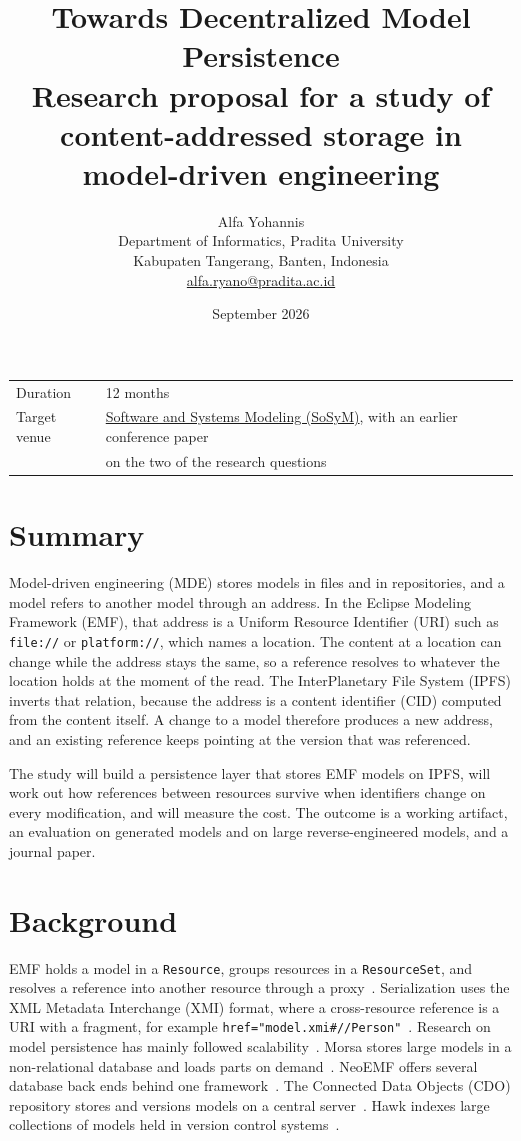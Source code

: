 \documentclass[11pt,a4paper]{article}
\title{\vspace{-12mm}\textbf{Towards Decentralized Model Persistence}\\[2mm]
\large Research proposal for a study of content-addressed storage in model-driven engineering}
\author{Alfa Yohannis\\
\small Department of Informatics, Pradita University\\
\small Kabupaten Tangerang, Banten, Indonesia\\
\small \href{mailto:alfa.ryano@pradita.ac.id}{alfa.ryano@pradita.ac.id}}
\date{September 2026}
\begin{document}
\maketitle

\begin{center}
\begin{tabular}{@{}ll@{}}
\toprule
Duration & 12 months \\
Target venue & \href{https://link.springer.com/journal/10270}{Software and Systems Modeling (SoSyM)}, with an earlier conference paper \\
 & on the two of the research questions \\
\bottomrule
\end{tabular}
\end{center}

\section{Summary}

Model-driven engineering (MDE) stores models in files and in repositories, and a model refers to another model through an address. In the Eclipse Modeling Framework (EMF), that address is a Uniform Resource Identifier (URI) such as \texttt{file://} or \texttt{platform://}, which names a location. The content at a location can change while the address stays the same, so a reference resolves to whatever the location holds at the moment of the read. The InterPlanetary File System (IPFS) inverts that relation, because the address is a content identifier (CID) computed from the content itself. A change to a model therefore produces a new address, and an existing reference keeps pointing at the version that was referenced.

The study will build a persistence layer that stores EMF models on IPFS, will work out how references between resources survive when identifiers change on every modification, and will measure the cost. The outcome is a working artifact, an evaluation on generated models and on large reverse-engineered models, and a journal paper.

\section{Background}

EMF holds a model in a \texttt{Resource}, groups resources in a \texttt{ResourceSet}, and resolves a reference into another resource through a proxy~\cite{steinberg2008emf}. Serialization uses the XML Metadata Interchange (XMI) format, where a cross-resource reference is a URI with a fragment, for example \texttt{href="model.xmi\#//Person"}~\cite{omg2015xmi}. Research on model persistence has mainly followed scalability~\cite{kolovos2013roadmap}. Morsa stores large models in a non-relational database and loads parts on demand~\cite{pagan2015repository}. NeoEMF offers several database back ends behind one framework~\cite{daniel2017neoemf}. The Connected Data Objects (CDO) repository stores and versions models on a central server~\cite{cdo}. Hawk indexes large collections of models held in version control systems~\cite{barmpis2013hawk}.
\end{document}
